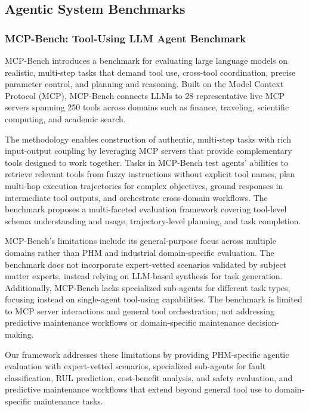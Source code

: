 \documentclass[conference]{IEEEtran}
\begin{document}
\subsection{Agentic System Benchmarks}

\subsubsection{MCP-Bench: Tool-Using LLM Agent Benchmark}

MCP-Bench \cite{wang2025mcpbench} introduces a benchmark for evaluating large language models on realistic, multi-step tasks that demand tool use, cross-tool coordination, precise parameter control, and planning and reasoning. Built on the Model Context Protocol (MCP), MCP-Bench connects LLMs to 28 representative live MCP servers spanning 250 tools across domains such as finance, traveling, scientific computing, and academic search.

The methodology enables construction of authentic, multi-step tasks with rich input-output coupling by leveraging MCP servers that provide complementary tools designed to work together. Tasks in MCP-Bench test agents' abilities to retrieve relevant tools from fuzzy instructions without explicit tool names, plan multi-hop execution trajectories for complex objectives, ground responses in intermediate tool outputs, and orchestrate cross-domain workflows. The benchmark proposes a multi-faceted evaluation framework covering tool-level schema understanding and usage, trajectory-level planning, and task completion.

MCP-Bench's limitations include its general-purpose focus across multiple domains rather than PHM and industrial domain-specific evaluation. The benchmark does not incorporate expert-vetted scenarios validated by subject matter experts, instead relying on LLM-based synthesis for task generation. Additionally, MCP-Bench lacks specialized sub-agents for different task types, focusing instead on single-agent tool-using capabilities. The benchmark is limited to MCP server interactions and general tool orchestration, not addressing predictive maintenance workflows or domain-specific maintenance decision-making.

Our framework addresses these limitations by providing PHM-specific agentic evaluation with expert-vetted scenarios, specialized sub-agents for fault classification, RUL prediction, cost-benefit analysis, and safety evaluation, and predictive maintenance workflows that extend beyond general tool use to domain-specific maintenance tasks.
\end{document}
